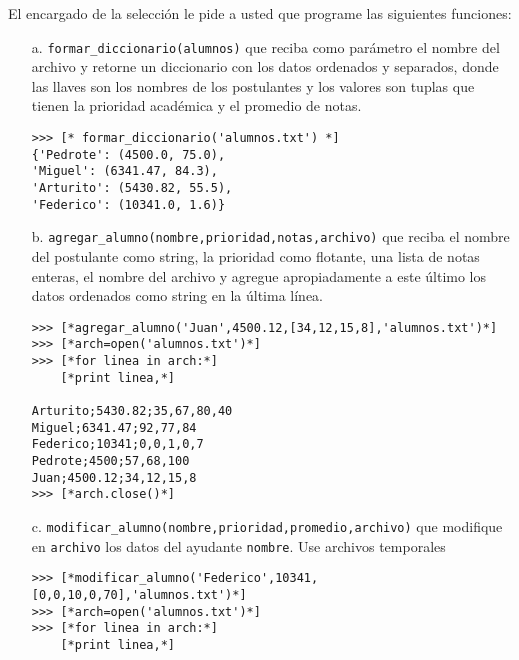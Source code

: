 El encargado de la selección le pide a usted que programe las siguientes funciones:
\begin{itemize}
    \item[a.] \texttt{formar\_diccionario(alumnos)} que reciba como parámetro el nombre del archivo y retorne un diccionario con los datos ordenados y separados, donde las llaves son los nombres de los postulantes y los valores son tuplas que tienen la prioridad académica y el promedio de notas.
    \begin{lstlisting}[style=consola]
>>> [* formar_diccionario('alumnos.txt') *]
{'Pedrote': (4500.0, 75.0), 
'Miguel': (6341.47, 84.3), 
'Arturito': (5430.82, 55.5), 
'Federico': (10341.0, 1.6)}
    \end{lstlisting}
    \item[b.] \texttt{agregar\_alumno(nombre,prioridad,notas,archivo)} que reciba el nombre del postulante como string, la prioridad como flotante, una lista de notas enteras, el nombre del archivo y agregue apropiadamente a este último los datos ordenados como string en la última línea.
    \begin{lstlisting}[style=consola]
>>> [*agregar_alumno('Juan',4500.12,[34,12,15,8],'alumnos.txt')*]
>>> [*arch=open('alumnos.txt')*]
>>> [*for linea in arch:*]
	[*print linea,*]

Arturito;5430.82;35,67,80,40
Miguel;6341.47;92,77,84
Federico;10341;0,0,1,0,7
Pedrote;4500;57,68,100
Juan;4500.12;34,12,15,8
>>> [*arch.close()*]
    \end{lstlisting}
    \item[c.] \texttt{modificar\_alumno(nombre,prioridad,promedio,archivo)} que modifique en \texttt{archivo} los datos del ayudante \texttt{nombre}. Use archivos temporales
    
    \begin{lstlisting}[style=consola]
>>> [*modificar_alumno('Federico',10341,[0,0,10,0,70],'alumnos.txt')*]
>>> [*arch=open('alumnos.txt')*]
>>> [*for linea in arch:*]
	[*print linea,*]
	

\end{lstlisting}
\end{itemize}
